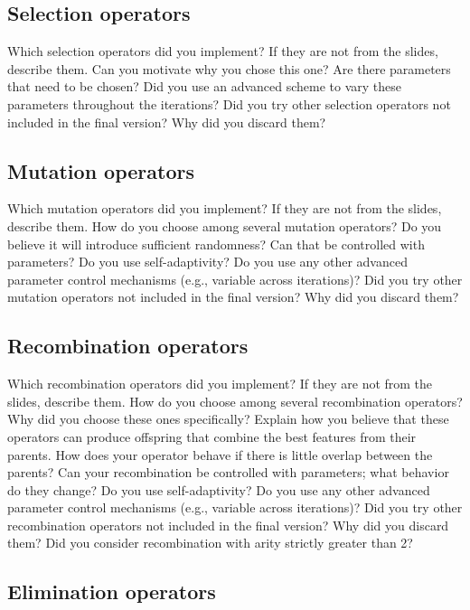 \documentclass[a4paper,10pt]{article}
\newcommand{\ReplaceMe}[1]{{\color{blue}#1}}
\begin{document}
\subsection{Selection operators}

\ReplaceMe{Which selection operators did you implement? If they are not from the slides, describe them. Can you motivate why you chose this one? Are there parameters that need to be chosen? Did you use an advanced scheme to vary these parameters throughout the iterations? Did you try other selection operators not included in the final version? Why did you discard them?}

\subsection{Mutation operators}

\ReplaceMe{Which mutation operators did you implement? If they are not from the slides, describe them. How do you choose among several mutation operators? Do you believe it will introduce sufficient randomness? Can that be controlled with parameters? Do you use self-adaptivity? Do you use any other advanced parameter control mechanisms (e.g., variable across iterations)? Did you try other mutation operators not included in the final version? Why did you discard them?}

\subsection{Recombination operators}

\ReplaceMe{Which recombination operators did you implement? If they are not from the slides, describe them. How do you choose among several recombination operators? Why did you choose these ones specifically? Explain how you believe that these operators can produce offspring that combine the best features from their parents. How does your operator behave if there is little overlap between the parents? Can your recombination be controlled with parameters; what behavior do they change? Do you use self-adaptivity? Do you use any other advanced parameter control mechanisms (e.g., variable across iterations)? Did you try other recombination operators not included in the final version? Why did you discard them? Did you consider recombination with arity strictly greater than 2?}

\subsection{Elimination operators}
\end{document}
